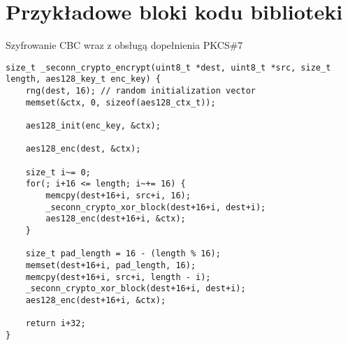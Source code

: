 \chapter{Przykładowe bloki kodu biblioteki}
\label{app:codesamples}




\begin{table}[ht]
\caption{Szyfrowanie CBC wraz z obsługą dopełnienia PKCS\#7}
\label{lst:encrypt}
\begin{lstlisting}
size_t _seconn_crypto_encrypt(uint8_t *dest, uint8_t *src, size_t length, aes128_key_t enc_key) {
    rng(dest, 16); // random initialization vector
    memset(&ctx, 0, sizeof(aes128_ctx_t));

    aes128_init(enc_key, &ctx);

    aes128_enc(dest, &ctx);

    size_t i~= 0;
    for(; i+16 <= length; i~+= 16) {
        memcpy(dest+16+i, src+i, 16);
        _seconn_crypto_xor_block(dest+16+i, dest+i);
        aes128_enc(dest+16+i, &ctx);
    }

    size_t pad_length = 16 - (length % 16);
    memset(dest+16+i, pad_length, 16);
    memcpy(dest+16+i, src+i, length - i);
    _seconn_crypto_xor_block(dest+16+i, dest+i);
    aes128_enc(dest+16+i, &ctx);

    return i+32;
}
\end{lstlisting}
\end{table}

